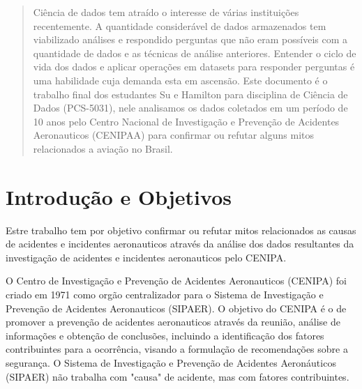 \documentclass[conference]{IEEEtran}
\begin{document}




\maketitle

\begin{abstract}
Ciência de dados tem atraído o interesse de várias instituições recentemente. A quantidade considerável de dados armazenados tem viabilizado análises e respondido perguntas
que não eram possíveis com a quantidade de dados e as técnicas de análise anteriores. Entender o ciclo de vida dos dados e aplicar operações em datasets para responder
perguntas é uma habilidade cuja demanda esta em ascensão. Este documento é o trabalho final dos estudantes Su e Hamilton para disciplina de Ciência de Dados (PCS-5031), nele
analisamos os dados coletados em um período de 10 anos pelo Centro Nacional de Investigação e Prevenção de Acidentes Aeronauticos (CENIPAA) para confirmar ou refutar alguns
mitos relacionados a aviação no Brasil.
\end{abstract}





%
\IEEEpeerreviewmaketitle

\section{Introdução e Objetivos}

Estre trabalho tem por objetivo confirmar ou refutar mitos relacionados as causas de acidentes e incidentes aeronauticos através da análise dos dados resultantes da 
investigação de acidentes e incidentes aeronauticos pelo CENIPA.

O Centro de Investigação e Prevenção de Acidentes Aeronauticos (CENIPA) foi criado em 1971 como orgão centralizador para o Sistema de Investigação e Prevenção de
Acidentes Aeronauticos (SIPAER). O objetivo do CENIPA é o de promover a prevenção de acidentes aeronauticos através da reunião, análise de informações e obtenção 
de conclusões, incluindo a identificação dos fatores contribuintes para a ocorrência, visando a formulação de recomendações sobre a segurança. O Sistema de Investigação
e Prevenção de Acidentes Aeronáuticos (SIPAER) não trabalha com "causa" de acidente, mas com fatores contribuintes.
\end{document}
